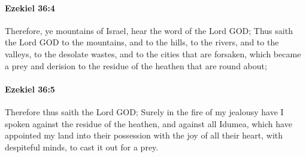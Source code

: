 		\paragraph{Ezekiel 36:4} %
			\label{EZEKIEL-36-4}

			Therefore, ye mountains of Israel, hear the word of the Lord GOD; Thus saith the Lord GOD to the mountains, and to the hills, to the rivers, and to the valleys, to the desolate wastes, and to the cities that are forsaken, which became a prey and derision to the residue of the heathen that are round about;


		\paragraph{Ezekiel 36:5} %
			\label{EZEKIEL-36-5}

			Therefore thus saith the Lord GOD; Surely in the fire of my jealousy have I spoken against the residue of the heathen, and against all Idumea, which have appointed my land into their possession with the joy of all their heart, with despiteful minds, to cast it out for a prey.

